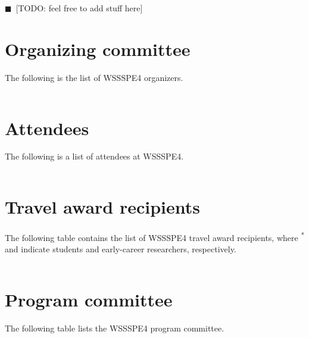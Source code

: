 \documentclass[11pt, oneside]{amsart}
\newcommand{\todo}[1]{{\color{blue}$\blacksquare$~\textsf{[TODO: #1]}}}
\begin{document}
\todo{feel free to add stuff here}

\newpage
\appendix
\section{Organizing committee}  \label{sec:orgcom}

The following is the list of WSSSPE4 organizers.

{\scriptsize
\begin{longtable}{lll}

\end{longtable}
}


\section{Attendees}  \label{sec:attendees}
The following is a list of attendees at WSSSPE4.

{\scriptsize
\begin{longtable}{lll}

\end{longtable}
}

\section{Travel award recipients}  \label{sec:awardees}
The following table contains the list of WSSSPE4 travel award recipients, where
\textsuperscript{*} and \textsuperscript{\textdagger} indicate students and
early-career researchers, respectively.

{\scriptsize
\begin{longtable}{lll}

\end{longtable}
}

\section{Program committee}  \label{sec:progcom}
The following table lists the WSSSPE4 program committee.
\end{document}
